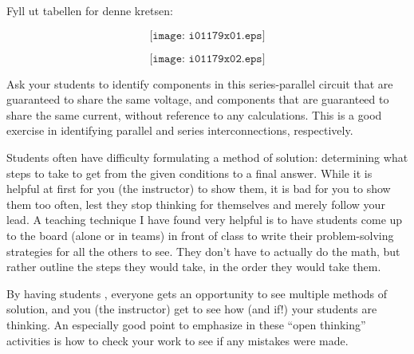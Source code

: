 

Fyll ut tabellen for denne kretsen:

$$\texttt{[image: i01179x01.eps]}$$







$$\texttt{[image: i01179x02.eps]}$$







Ask your students to identify components in this series-parallel circuit that are guaranteed to share the same voltage, and components that are guaranteed to share the same current, without reference to any calculations.  This is a good exercise in identifying parallel and series interconnections, respectively.

\vskip 10pt

Students often have difficulty formulating a method of solution: determining what steps to take to get from the given conditions to a final answer.  While it is helpful at first for you (the instructor) to show them, it is bad for you to show them too often, lest they stop thinking for themselves and merely follow your lead.  A teaching technique I have found very helpful is to have students come up to the board (alone or in teams) in front of class to write their problem-solving strategies for all the others to see.  They don't have to actually do the math, but rather outline the steps they would take, in the order they would take them.

By having students , everyone gets an opportunity to see multiple methods of solution, and you (the instructor) get to see how (and if!) your students are thinking.  An especially good point to emphasize in these ``open thinking'' activities is how to check your work to see if any mistakes were made.




